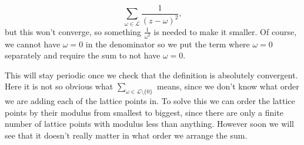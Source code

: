 \documentclass{article}
\theoremstyle{definition}
\theoremstyle{definition}
\theoremstyle{definition}
\begin{document}
$$\sum_{\omega\in\mathcal{L}}\frac{1}{(z-\omega)^2},$$
but this won't converge, so something $\frac{1}{\omega^2}$ is needed to make it smaller. Of course, we cannot have $\omega=0$ in the denominator so we put the term where $\omega=0$ separately and require the sum to not have $\omega=0$.

This will stay periodic once we check that the definition is absolutely convergent.
\newline\newline
Here it is not so obvious what $\sum_{\omega\in\mathcal{L}\setminus\{0\}}$ means, since we don't know what order we are adding each of the lattice points in. To solve this we can order the lattice points by their modulus from smallest to biggest, since there are only a finite number of lattice points with modulus less than anything. However soon we will see that it doesn't really matter in what order we arrange the sum.
\end{document}
